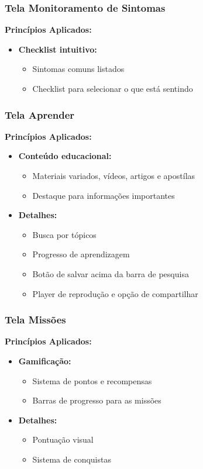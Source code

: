 \documentclass[a4paper, 12pt]{article}
\begin{document}
\subsubsection{Tela Monitoramento de Sintomas}
\textbf{Princípios Aplicados:}
\begin{itemize}[leftmargin=*]
    \item \textbf{Checklist intuitivo:}
    \begin{itemize}
        \item Sintomas comuns listados
        \item Checklist para selecionar o que está sentindo
    \end{itemize}
\end{itemize}

\subsubsection{Tela Aprender}
\textbf{Princípios Aplicados:}
\begin{itemize}[leftmargin=*]
    \item \textbf{Conteúdo educacional:}
    \begin{itemize}
        \item Materiais variados, vídeos, artigos e apostílas
        \item Destaque para informações importantes
    \end{itemize}

    \item \textbf{Detalhes:}
    \begin{itemize}
        \item Busca por tópicos
        \item Progresso de aprendizagem
        \item Botão de salvar acima da barra de pesquisa
        \item Player de reprodução e opção de compartilhar
    \end{itemize}
\end{itemize}

\subsubsection{Tela Missões}
\textbf{Princípios Aplicados:}
\begin{itemize}[leftmargin=*]
    \item \textbf{Gamificação:}
    \begin{itemize}
        \item Sistema de pontos e recompensas
        \item Barras de progresso para as missões
    \end{itemize}
    
    \item \textbf{Detalhes:}
    \begin{itemize}
        \item Pontuação visual
        \item Sistema de conquistas
    \end{itemize}
\end{itemize}
\end{document}

